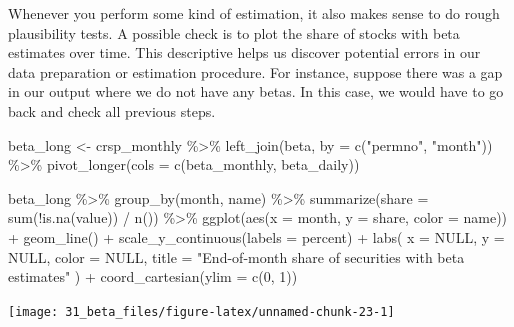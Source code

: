 \documentclass[
]{krantz}
\newenvironment{Shaded}{\begin{snugshade}}{\end{snugshade}}
\newcommand{\AttributeTok}[1]{\textcolor[rgb]{0.61,0.61,0.61}{#1}}
\newcommand{\ConstantTok}[1]{\textcolor[rgb]{0,0,0}{#1}}
\newcommand{\DecValTok}[1]{\textcolor[rgb]{0.06,0.06,0.06}{#1}}
\newcommand{\FunctionTok}[1]{\textcolor[rgb]{0,0,0}{#1}}
\newcommand{\NormalTok}[1]{#1}
\newcommand{\OtherTok}[1]{\textcolor[rgb]{0.37,0.37,0.37}{#1}}
\newcommand{\SpecialCharTok}[1]{\textcolor[rgb]{0,0,0}{#1}}
\newcommand{\StringTok}[1]{\textcolor[rgb]{0.5,0.5,0.5}{#1}}
\begin{document}
Whenever you perform some kind of estimation, it also makes sense to do rough plausibility tests. A possible check is to plot the share of stocks with beta estimates over time.
This descriptive helps us discover potential errors in our data preparation or estimation procedure.
For instance, suppose there was a gap in our output where we do not have any betas.
In this case, we would have to go back and check all previous steps.

\begin{Shaded}
\begin{Highlighting}[]
\NormalTok{beta\_long }\OtherTok{\textless{}{-}}\NormalTok{ crsp\_monthly }\SpecialCharTok{\%\textgreater{}\%}
  \FunctionTok{left\_join}\NormalTok{(beta, }\AttributeTok{by =} \FunctionTok{c}\NormalTok{(}\StringTok{"permno"}\NormalTok{, }\StringTok{"month"}\NormalTok{)) }\SpecialCharTok{\%\textgreater{}\%}
  \FunctionTok{pivot\_longer}\NormalTok{(}\AttributeTok{cols =} \FunctionTok{c}\NormalTok{(beta\_monthly, beta\_daily))}

\NormalTok{beta\_long }\SpecialCharTok{\%\textgreater{}\%}
  \FunctionTok{group\_by}\NormalTok{(month, name) }\SpecialCharTok{\%\textgreater{}\%}
  \FunctionTok{summarize}\NormalTok{(}\AttributeTok{share =} \FunctionTok{sum}\NormalTok{(}\SpecialCharTok{!}\FunctionTok{is.na}\NormalTok{(value)) }\SpecialCharTok{/} \FunctionTok{n}\NormalTok{()) }\SpecialCharTok{\%\textgreater{}\%}
  \FunctionTok{ggplot}\NormalTok{(}\FunctionTok{aes}\NormalTok{(}\AttributeTok{x =}\NormalTok{ month, }\AttributeTok{y =}\NormalTok{ share, }\AttributeTok{color =}\NormalTok{ name)) }\SpecialCharTok{+}
  \FunctionTok{geom\_line}\NormalTok{() }\SpecialCharTok{+}
  \FunctionTok{scale\_y\_continuous}\NormalTok{(}\AttributeTok{labels =}\NormalTok{ percent) }\SpecialCharTok{+}
  \FunctionTok{labs}\NormalTok{(}
    \AttributeTok{x =} \ConstantTok{NULL}\NormalTok{, }\AttributeTok{y =} \ConstantTok{NULL}\NormalTok{, }\AttributeTok{color =} \ConstantTok{NULL}\NormalTok{,}
    \AttributeTok{title =} \StringTok{"End{-}of{-}month share of securities with beta estimates"}
\NormalTok{  ) }\SpecialCharTok{+}
  \FunctionTok{coord\_cartesian}\NormalTok{(}\AttributeTok{ylim =} \FunctionTok{c}\NormalTok{(}\DecValTok{0}\NormalTok{, }\DecValTok{1}\NormalTok{))}
\end{Highlighting}
\end{Shaded}

\begin{center}\texttt{[image: 31\_beta\_files/figure-latex/unnamed-chunk-23-1]} \end{center}
\end{document}

